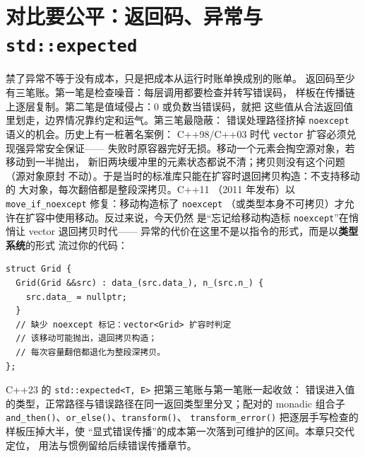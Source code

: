 \documentclass[12pt,a4paper,fontset=fandol]{ctexbook}
\newcommand{\cpp}[1]{C++#1}
\newcommand{\Fn}[1]{\texttt{#1()}}
\newcommand{\Tp}[1]{\texttt{#1}}
\newcommand{\Bk}{\discretionary{}{}{}}
\begin{document}
\section{对比要公平：返回码、异常与 \Tp{std::expected}}
\label{sec:ch10-compare}

禁了异常不等于没有成本，只是把成本从运行时账单换成别的账单。
返回码至少有三笔账。第一笔是检查噪音：每层调用都要检查并转写错误码，
样板在传播链上逐层复制。第二笔是值域侵占：0 或负数当错误码，就把
这些值从合法返回值里划走，边界情况靠约定和运气。第三笔最隐蔽：
错误处理路径挤掉 \Tp{noexcept} 语义的机会。历史上有一桩著名案例：
\cpp{98}/{\Bk}\cpp{03} 时代 \Tp{vector} 扩容必须兑现强异常安全保证——
失败时原容器完好无损。移动一个元素会掏空源对象，若移动到一半抛出，
新旧两块缓冲里的元素状态都说不清；拷贝则没有这个问题（源对象原封
不动）。于是当时的标准库只能在扩容时退回拷贝构造：不支持移动的
大对象，每次翻倍都是整段深拷贝。\cpp{11} （2011 年发布）以
\Tp{move{\Bk}\_if{\Bk}\_noexcept} 修复：移动构造标了 \Tp{noexcept}
（或类型本身不可拷贝）才允许在扩容中使用移动。反过来说，今天仍然
是``忘记给移动构造标 \Tp{noexcept}''在悄悄让 vector 退回拷贝时代——
异常的代价在这里不是以指令的形式，而是以\textbf{类型系统}的形式
流过你的代码：

\begin{lstlisting}[style=cppstyle]
struct Grid {
  Grid(Grid &&src) : data_(src.data_), n_(src.n_) {
    src.data_ = nullptr;
  }
  // 缺少 noexcept 标记：vector<Grid> 扩容时判定
  // 该移动可能抛出，退回拷贝构造；
  // 每次容量翻倍都退化为整段深拷贝。
};
\end{lstlisting}

\cpp{23} 的 \Tp{std::expected<T, E>} 把第三笔账与第一笔账一起收敛：
错误进入值的类型，正常路径与错误路径在同一返回类型里分叉；配对的
monadic 组合子 \Fn{and\_then}、\Fn{or\_else}、\Fn{transform}、
\Fn{transform{\Bk}\_error} 把逐层手写检查的样板压掉大半，使
``显式错误传播''的成本第一次落到可维护的区间。本章只交代定位，
用法与惯例留给后续错误传播章节。
\end{document}
